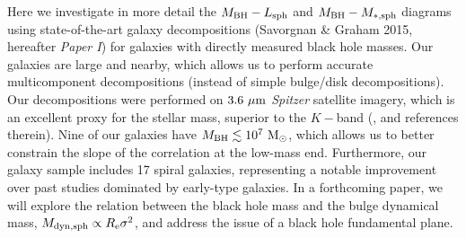 \documentclass[preprint2]{emulateapj}
\begin{document}
Here we investigate in more detail %
the $M_{\rm BH} - L_{\rm sph}$ and $M_{\rm BH} - M_{\rm *,sph}$ diagrams 
using state-of-the-art galaxy decompositions (Savorgnan \& Graham 2015, hereafter \emph{Paper I}) 
for galaxies with directly measured black hole masses.
Our galaxies are large and nearby, which allows us to perform accurate multicomponent decompositions 
(instead of simple bulge/disk decompositions). 
Our decompositions were performed on $3.6\rm~\mu m$ \emph{Spitzer} satellite imagery, 
which is an excellent proxy for the stellar mass, superior to the $K-$band (\citealt{sheth2010}, and references therein).
Nine of our galaxies have $M_{\rm BH} \lesssim 10^7\rm~M_\odot$, 
which allows us to better constrain the slope of the correlation at the low-mass end.
Furthermore, our galaxy sample includes 17 spiral galaxies, 
representing a notable improvement over past studies dominated by early-type galaxies. 
In a forthcoming paper, we will explore the relation between the black hole mass and the bulge dynamical mass, 
$M_{\rm dyn,sph} \propto R_{\rm e} \sigma^2$, and address the issue of a black hole fundamental plane.
\end{document}
